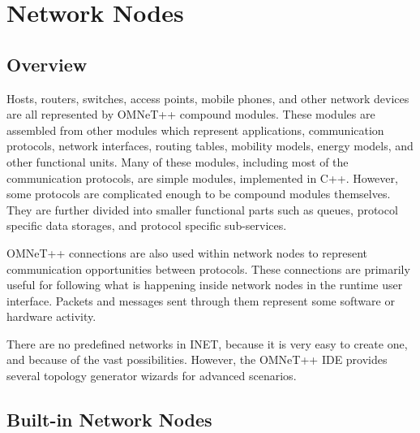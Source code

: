 \chapter{Network Nodes}
\label{cha:network-nodes}




\section{Overview}

Hosts, routers, switches, access points, mobile phones, and other network
devices are all represented by OMNeT++ compound modules. These modules are
assembled from other modules which represent applications, communication
protocols, network interfaces, routing tables, mobility models, energy
models, and other functional units. Many of these modules, including most
of the communication protocols, are simple modules, implemented in C++.
However, some protocols are complicated enough to be compound modules
themselves. They are further divided into smaller functional parts such as
queues, protocol specific data storages, and protocol specific
sub-services.

OMNeT++ connections are also used within network nodes to represent
communication opportunities between protocols. These connections are
primarily useful for following what is happening inside network nodes in
the runtime user interface. Packets and messages sent through them
represent some software or hardware activity.

There are no predefined networks in INET, because it is very easy to create
one, and because of the vast possibilities. However, the OMNeT++ IDE provides
several topology generator wizards for advanced scenarios.

\section{Built-in Network Nodes}

